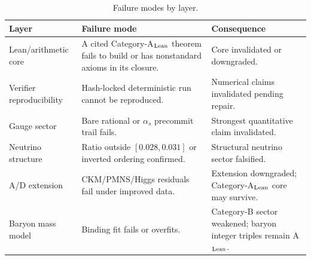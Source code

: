 \documentclass[11pt]{article}
\theoremstyle{remark}
\begin{document}
\begin{table}[H]
\centering
\caption{Failure modes by layer.}
\label{tab:failure_modes}
\small
\renewcommand{\arraystretch}{1.15}
\begin{tabularx}{\linewidth}{@{}p{2.8cm}X X@{}}
\toprule
\textbf{Layer} & \textbf{Failure mode} & \textbf{Consequence} \\
\midrule
Lean/arithmetic core & A cited Category-A$_{\rm Lean}$ theorem fails to build or has nonstandard axioms in its closure. & Core invalidated or downgraded. \\
Verifier reproducibility & Hash-locked deterministic run cannot be reproduced. & Numerical claims invalidated pending repair. \\
Gauge sector & Bare rational or $\alpha_s$ precommit trail fails. & Strongest quantitative claim invalidated. \\
Neutrino structure & Ratio outside $[0.028,0.031]$ or inverted ordering confirmed. & Structural neutrino sector falsified. \\
A/D extension & CKM/PMNS/Higgs residuals fail under improved data. & Extension downgraded; Category-A$_{\rm Lean}$ core may survive. \\
Baryon mass model & Binding fit fails or overfits. & Category-B sector weakened; baryon integer triples remain A$_{\rm Lean}$. \\
\bottomrule
\end{tabularx}
\end{table}
\end{document}
